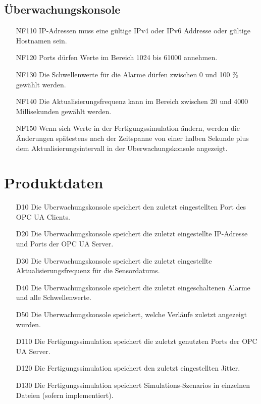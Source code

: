 \documentclass[parskip=full]{scrartcl}
\begin{document}
\subsection{Überwachungskonsole}
\begin{enumerate}
 \item[NF110] IP-Adressen muss eine gültige IPv4 oder IPv6 Addresse oder gültige Hostnamen sein. %
 \item[NF120] Ports dürfen Werte im Bereich 1024 bis 61000 annehmen.
 \item[NF130] Die Schwellenwerte für die Alarme dürfen zwischen 0 und 100 \% gewählt werden.
 \item[NF140] Die Aktualisierungsfrequenz kann im Bereich zwischen 20 und 4000 Millisekunden gewählt werden.
 \item[NF150] Wenn sich Werte in der \gls{Fertigungssimulation} ändern, werden die Änderungen spätestens nach der Zeitspanne von
   einer halben Sekunde plus dem Aktualisierungsintervall in der \gls{Uberwachungskonsole} angezeigt.
\end{enumerate}

\pagebreak
\section{Produktdaten}
\begin{enumerate}
 \item[D10] Die \gls{Uberwachungskonsole} speichert den zuletzt eingestellten Port des \gls{OPC UA} Clients.
 \item[D20] Die \gls{Uberwachungskonsole} speichert die zuletzt eingestellte IP-Adresse und Ports der \gls{OPC UA} Server.
 \item[D30] Die \gls{Uberwachungskonsole} speichert die zuletzt eingestellte Aktualisierungsfrequenz für die \glspl{Sensordatum}.
 \item[D40] Die \gls{Uberwachungskonsole} speichert die zuletzt eingeschaltenen Alarme und alle Schwellenwerte.
 \item[D50] Die \gls{Uberwachungskonsole} speichert, welche Verläufe zuletzt angezeigt wurden.
 \item[D110] Die \gls{Fertigungssimulation} speichert die zuletzt genutzten Ports der \gls{OPC UA} Server.
 \item[D120] Die \gls{Fertigungssimulation} speichert den zuletzt eingestellten \gls{Jitter}.
 \item[D130] Die \gls{Fertigungssimulation} speichert \glspl{Simulations-Szenario} in einzelnen Dateien (sofern implementiert).
\end{enumerate}
\end{document}
